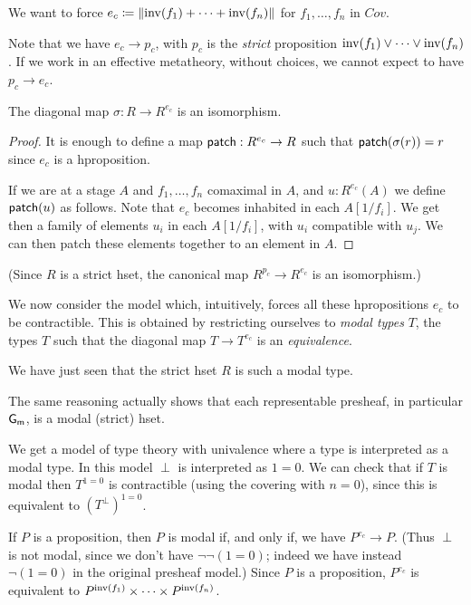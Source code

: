 We want to force $e_c \coloneqq \left\lVert \mathrm{inv}(f_1)+\dots+\mathrm{inv}(f_n) \right\rVert$ for $f_1,\dots,f_n$ in $Cov$.

Note that we have $e_c\rightarrow p_c$, with $p_c$ is the {\em strict} proposition $\mathrm{inv}(f_1)\vee \dots\vee\mathrm{inv}(f_n)$.
If we work in an effective metatheory, without choices, we cannot expect to have $p_c\rightarrow e_c$.

\begin{lemma}
  The diagonal map $\sigma:R\rightarrow R^{e_c}$ is an isomorphism.
\end{lemma}

\begin{proof}
  It is enough to define a map $\mathsf{patch}:R^{e_c}\rightarrow R$ such that $\mathsf{patch}(\sigma(r)) = r$ since
  $e_c$ is a hproposition.

  If we are at a stage $A$ and $f_1,\dots,f_n$ comaximal in $A$, and $u:R^{e_c}(A)$ we define $\mathsf{patch}(u)$ as follows.
  Note that $e_c$ becomes inhabited in each $A[1/f_i]$. We get then a family of elements $u_i$ in each $A[1/f_i]$, with $u_i$ compatible
  with $u_j$. We can then patch these elements together to an element in $A$.
\end{proof}

(Since $R$ is a strict hset, the canonical map $R^{p_c}\rightarrow R^{e_c}$ is an isomorphism.)

We now consider the model which, intuitively, forces all these hpropositions $e_c$ to be contractible.
This is obtained by restricting ourselves to {\em modal types} $T$, the types
$T$ such that the diagonal map $T\rightarrow T^{e_c}$ is an {\em equivalence}.

\medskip

We have just seen that the strict hset $R$ is such a modal type.

The same reasoning actually shows that each representable presheaf, in particular $\mathsf{G_m}$, is a modal
(strict) hset.

\medskip

We get a model of type theory with univalence where a type is interpreted as a modal type.
In this model $\perp$ is interpreted as $1=0$. We can check that if $T$ is modal then
$T^{1=0}$ is contractible (using the covering with $n=0$), since this is equivalent to $(T^{\perp})^{1=0}$.

\medskip

If $P$ is a proposition, then $P$ is modal if, and only if,
we have $P^{e_c}\rightarrow P$.
(Thus $\perp$ is not modal, since we don't have $\neg\neg(1=0)$; indeed we have instead $\neg(1=0)$ in
the original presheaf model.)
Since $P$ is a
proposition, $P^{e_c}$ is equivalent to $P^{\mathrm{inv}(f_1)}\times \dots\times P^{\mathrm{inv}(f_n)}$.

